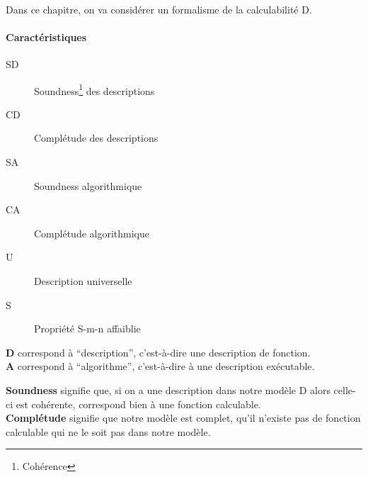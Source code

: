 \begin{description}
\paragraph{} Dans ce chapitre, on va considérer un formalisme de la calculabilité D.

\begin{samepage}
\paragraph{Caractéristiques}
\begin{description}
	\item[SD] Soundness\footnote{Cohérence} des descriptions
	\item[CD] Complétude des descriptions
	\item[SA] Soundness algorithmique
	\item[CA] Complétude algorithmique
	\item[U] Description universelle\nopagebreak
	\item[S] Propriété S-m-n affaiblie
\end{description}
\end{samepage}

\begin{myrem}
	\textbf{D} correspond à ``description'', c'est-à-dire une description de fonction.\\
	\textbf{A} correspond à ``algorithme'', c'est-à-dire à une description exécutable.
\end{myrem}

\begin{myrem}
	\textbf{Soundness} signifie que, si on a une description dans notre modèle D alors celle-ci est cohérente, correspond bien à une fonction calculable.\\
	\textbf{Complétude} signifie que notre modèle est complet, qu'il n'existe pas de fonction calculable qui ne le soit pas dans notre modèle.
\end{myrem}


\end{description}
